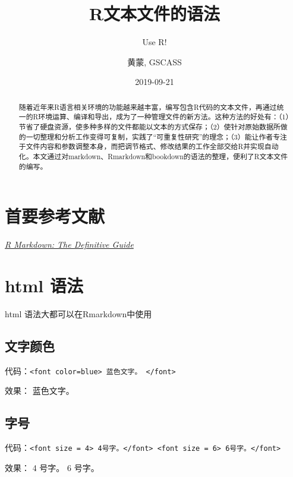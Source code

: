 \documentclass[]{article}
\title{R文本文件的语法}
\subtitle{Use R!}
\author{黄蒙, GSCASS}
\date{2019-09-21}
\begin{document}
\maketitle
\begin{abstract}
随着近年来R语言相关环境的功能越来越丰富，编写包含R代码的文本文件，再通过统一的R环境运算、编译和导出，成为了一种管理文件的新方法。这种方法的好处有：（1）节省了硬盘资源，使多种多样的文件都能以文本的方式保存；（2）使针对原始数据所做的一切整理和分析工作变得可复制，实践了``可重复性研究''的理念；（3）能让作者专注于文件内容和参数调整本身，而把调节格式、修改结果的工作全部交给R并实现自动化。本文通过对markdown、Rmarkdown和bookdown的语法的整理，便利了R文本文件的编写。
\end{abstract}

{
\setcounter{tocdepth}{2}
\tableofcontents
}
\hypertarget{section}{%
\section*{首要参考文献}\label{section}}

\href{https://bookdown.org/yihui/rmarkdown/}{\emph{R Markdown: The Definitive Guide}}

\hypertarget{html-}{%
\section{html 语法}\label{html-}}

html 语法大都可以在Rmarkdown中使用

\hypertarget{section-1}{%
\subsection{文字颜色}\label{section-1}}

代码：\texttt{\textless{}font\ color=\textquotesingle{}blue\textquotesingle{}\textgreater{}\ 蓝色文字。\ \textless{}/font\textgreater{}}

效果： 蓝色文字。

\hypertarget{section-2}{%
\subsection{字号}\label{section-2}}

代码：\texttt{\textless{}font\ size\ =\ 4\textgreater{}\ 4号字。\textless{}/font\textgreater{}\ \textless{}font\ size\ =\ 6\textgreater{}\ 6号字。\textless{}/font\textgreater{}}

效果： 4 号字。 6 号字。
\end{document}

